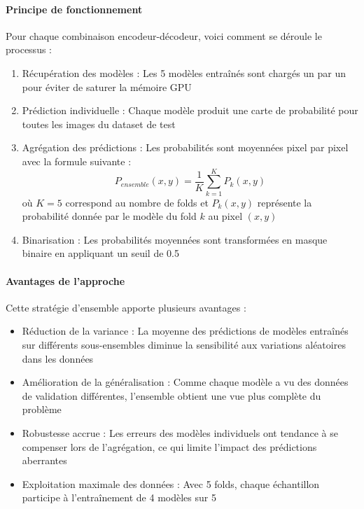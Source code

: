 \paragraph{Principe de fonctionnement}

Pour chaque combinaison encodeur-décodeur, voici comment se déroule le processus :

\begin{enumerate}
    \item Récupération des modèles : Les 5 modèles entraînés sont chargés un par un pour éviter de saturer la mémoire GPU
    \item Prédiction individuelle : Chaque modèle produit une carte de probabilité pour toutes les images du dataset de test
    \item Agrégation des prédictions : Les probabilités sont moyennées pixel par pixel avec la formule suivante :
    \vspace{0.45cm}
    \begin{equation}
        P_{ensemble}(x,y) = \frac{1}{K} \sum_{k=1}^{K} P_k(x,y)
    \end{equation}
    où $K=5$ correspond au nombre de folds et $P_k(x,y)$ représente la probabilité donnée par le modèle du fold $k$ au pixel $(x,y)$
    \item Binarisation : Les probabilités moyennées sont transformées en masque binaire en appliquant un seuil de 0.5
\end{enumerate}

\paragraph{Avantages de l'approche}

Cette stratégie d'ensemble apporte plusieurs avantages :

\begin{itemize}
    \item Réduction de la variance : La moyenne des prédictions de modèles entraînés sur différents sous-ensembles diminue la sensibilité aux variations aléatoires dans les données
    \item Amélioration de la généralisation : Comme chaque modèle a vu des données de validation différentes, l'ensemble obtient une vue plus complète du problème
    \item Robustesse accrue : Les erreurs des modèles individuels ont tendance à se compenser lors de l'agrégation, ce qui limite l'impact des prédictions aberrantes
    \item Exploitation maximale des données : Avec 5 folds, chaque échantillon participe à l'entraînement de 4 modèles sur 5
\end{itemize}

